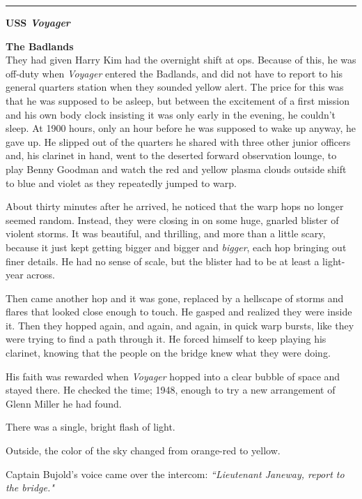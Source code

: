 \documentclass[twoside,letterpaper,12pt]{memoir}
\begin{document}
\begin{center}\rule{3cm}{0.4 pt}\end{center}

\noindent\textbf{USS \textit{Voyager}}

\noindent\textbf{The Badlands}\\

They had given Harry Kim had the overnight shift at ops. Because of this, he was off-duty when \textit{Voyager} entered the Badlands, and did not have to report to his general quarters station when they sounded yellow alert. The price for this was that he was supposed to be asleep, but between the excitement of a first mission and his own body clock insisting it was only early in the evening, he couldn't sleep. At 1900 hours, only an hour before he was supposed to wake up anyway, he gave up. He slipped out of the quarters he shared with three other junior officers and, his clarinet in hand, went to the deserted forward observation lounge, to play Benny Goodman and watch the red and yellow plasma clouds outside shift to blue and violet as they repeatedly jumped to warp.

About thirty minutes after he arrived, he noticed that the warp hops no longer seemed random. Instead, they were closing in on some huge, gnarled blister of violent storms. It was beautiful, and thrilling, and more than a little scary, because it just kept getting bigger and bigger and \textit{bigger}, each hop bringing out finer details. He had no sense of scale, but the blister had to be at least a light-year across.

Then came another hop and it was gone, replaced by a hellscape of storms and flares that looked close enough to touch. He gasped and realized they were inside it. Then they hopped again, and again, and again, in quick warp bursts, like they were trying to find a path through it. He forced himself to keep playing his clarinet, knowing that the people on the bridge knew what they were doing.

His faith was rewarded when \textit{Voyager} hopped into a clear bubble of space and stayed there. He checked the time; 1948, enough to try a new arrangement of Glenn Miller he had found.

There was a single, bright flash of light.

Outside, the color of the sky changed from orange-red to yellow.

Captain Bujold's voice came over the intercom: \textit{``Lieutenant Janeway, report to the bridge." }
\end{document}

